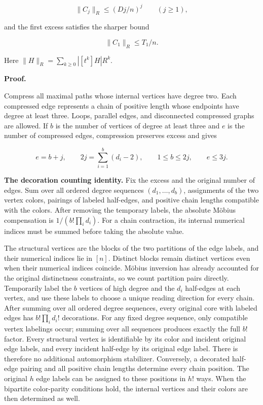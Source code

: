 \documentclass[11pt,a4paper]{article}
\begin{document}
\begin{equation}
\|C_j\|_R\le(Dj/n)^j\qquad(j\ge1),
\tag{3.2}
\label{eq-core-activity}
\end{equation}

and the first excess satisfies the sharper bound

\[
\|C_1\|_R\le T_1/n.
\]

Here \(\|H\|_R=\sum_{k\ge0}|[t^k]H|R^k\).

\textbf{Proof.}

Compress all maximal paths whose internal vertices have degree two. Each compressed edge represents a chain of positive length whose endpoints have degree at least three. Loops, parallel edges, and disconnected compressed graphs are allowed. If \(b\) is the number of vertices of degree at least three and \(e\) is the number of compressed edges, compression preserves excess and gives

\[
e=b+j,\qquad
2j=\sum_{i=1}^b(d_i-2),\qquad
1\le b\le2j,\qquad e\le3j.
\]

\textbf{The decoration counting identity.} Fix the excess and the original number of edges. Sum over all ordered degree sequences \((d_1,\ldots,d_b)\), assignments of the two vertex colors, pairings of labeled half-edges, and positive chain lengths compatible with the colors. After removing the temporary labels, the absolute Möbius compensation is \(1/(b!\prod_i d_i)\). For a chain contraction, its internal numerical indices must be summed before taking the absolute value.

The structural vertices are the blocks of the two partitions of the edge labels, and their numerical indices lie in \([n]\). Distinct blocks remain distinct vertices even when their numerical indices coincide. Möbius inversion has already accounted for the original distinctness constraints, so we count partition pairs directly. Temporarily label the \(b\) vertices of high degree and the \(d_i\) half-edges at each vertex, and use these labels to choose a unique reading direction for every chain. After summing over all ordered degree sequences, every original core with labeled edges has \(b!\prod_i d_i!\) decorations. For any fixed degree sequence, only compatible vertex labelings occur; summing over all sequences produces exactly the full \(b!\) factor. Every structural vertex is identifiable by its color and incident original edge labels, and every incident half-edge by its original edge label. There is therefore no additional automorphism stabilizer. Conversely, a decorated half-edge pairing and all positive chain lengths determine every chain position. The original \(h\) edge labels can be assigned to these positions in \(h!\) ways. When the bipartite color-parity conditions hold, the internal vertices and their colors are then determined as well.
\end{document}
